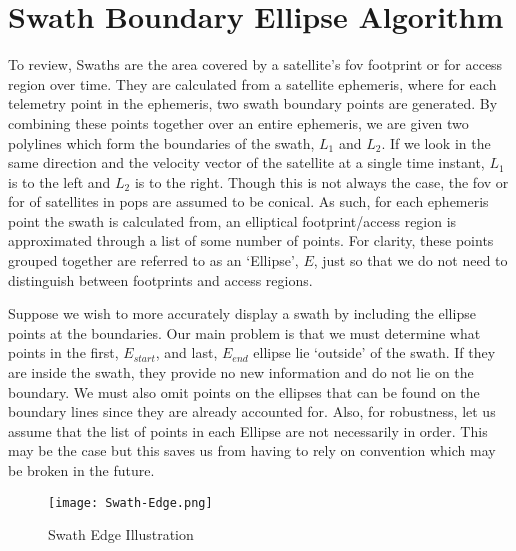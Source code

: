 
\section{Swath Boundary Ellipse Algorithm} \label{alg:ellipse}

To review, Swaths are the area covered by a satellite's \gls{fov} footprint or
\gls{for} access region over time. They are calculated from a satellite
ephemeris, where for each telemetry point in the ephemeris, two swath boundary
points are generated. By combining these points together over an entire
ephemeris, we are given two polylines which form the boundaries of the swath,
$L_1$ and $L_2$. If we look in the same direction and the velocity vector of
the satellite at a single time instant, $L_1$ is to the left and $L_2$ is to
the right. Though this is not always the case, the \gls{fov} or \gls{for} of
satellites in \gls{pops} are assumed to be conical. As such, for each ephemeris
point the swath is calculated from, an elliptical footprint/access region is
approximated through a list of some number of points. For clarity, these points
grouped together are referred to as an `Ellipse', $E$, just so that we do not
need to distinguish between footprints and access regions.  

Suppose we wish to more accurately display a swath by including the ellipse
points at the boundaries. Our main problem is that we must determine what
points in the first, $E_{start}$, and last, $E_{end}$ ellipse lie `outside' of the
swath.  If they are inside the swath, they provide no new information and do
not lie on the boundary.  We must also omit points on the ellipses that can be
found on the boundary lines since they are already accounted for. Also, for
robustness, let us assume that the list of points in each Ellipse are not
necessarily in order. This may be the case but this saves us from having to
rely on convention which may be broken in the future.

\begin{figure}[h]
    \centering
    \texttt{[image: Swath-Edge.png]} 
    \caption{Swath Edge Illustration}
    \label{fig:swath-edge}
\end{figure}


\newcommand{\Fs}{$\vec{\mathcal{F}}_s$} 

